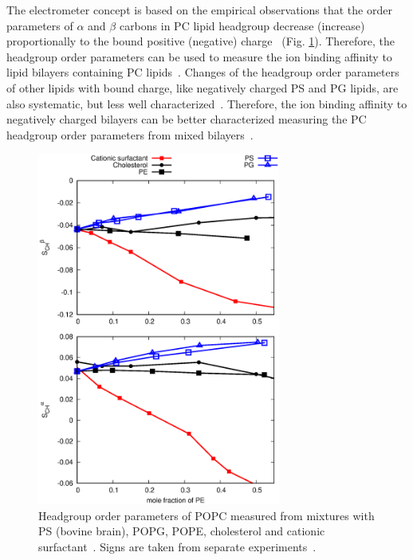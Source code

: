 \documentclass[journal=jpcbfk]{achemso}
\begin{document}
The electrometer concept is based on the empirical observations that
the order parameters of $\alpha$ and $\beta$ carbons in PC lipid headgroup
decrease (increase) proportionally to the bound positive (negative) 
charge~\cite{akutsu81,altenbach84,seelig87,scherer89} (Fig. \ref{HGorderparametersPCvsPEPSPGchol}). 
Therefore, the headgroup order parameters can be used to measure the
ion binding affinity to lipid bilayers containing PC
lipids~\cite{akutsu81,altenbach84,borle85,seelig87,macdonald87,roux90}.
Changes of the headgroup order parameters of other lipids with bound charge,
like negatively charged PS and PG lipids,  are also systematic,
but less well characterized~\cite{borle85,macdonald87,roux86,roux90}.
Therefore, the ion binding affinity to negatively charged bilayers
can be better characterized measuring the PC headgroup order parameters from 
mixed bilayers~\cite{borle85,roux86,macdonald87,roux90,roux91}.
\begin{figure}[]
  \centering
  \includegraphics[width=8.0cm]{../Figs/HGorderparametersPCvsPEPSPGchol.eps}
  \caption{\label{HGorderparametersPCvsPEPSPGchol}
    Headgroup order parameters of POPC measured from mixtures with
    PS (bovine brain), POPG, POPE, cholesterol and cationic surfactant~\cite{scherer87,scherer89,ferreira13}.
    Signs are taken from separate experiments~\cite{ollila16,ferreira16}.
  }
\end{figure}
\end{document}
